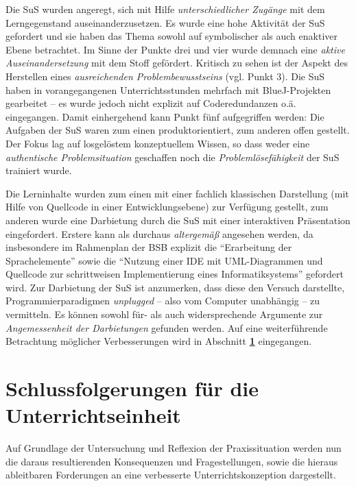 \documentclass[paper=a4, DIV=13, BCOR=8mm, oneside=on, onecolumn=on, open = any, titlepage =on, parskip =half-, headsepline = on, footsepline = off, chapterprefix = on, sectionprefix = on, appendixprefix = off, fontsize = 12pt, numbers = noenddot, abstract = off]{scrreprt}
\begin{document}
Die SuS wurden angeregt, sich mit Hilfe \emph{unterschiedlicher Zugänge} mit dem Lerngegenstand auseinanderzusetzen. Es wurde eine hohe Aktivität der SuS gefordert und sie haben das Thema sowohl auf symbolischer als auch enaktiver Ebene betrachtet. Im Sinne der Punkte drei und vier wurde demnach eine \emph{aktive Auseinandersetzung} mit dem Stoff gefördert. Kritisch zu sehen ist der Aspekt des Herstellen eines \emph{ausreichenden Problembewusstseins} (vgl. Punkt 3). Die SuS haben in vorangegangenen Unterrichtsstunden mehrfach mit BlueJ-Projekten gearbeitet -- es wurde jedoch nicht explizit auf Coderedundanzen o.ä. eingegangen. Damit einhergehend kann Punkt fünf aufgegriffen werden: Die Aufgaben der SuS waren zum einen produktorientiert, zum anderen offen gestellt. Der Fokus lag auf losgelöstem konzeptuellem Wissen, so dass weder eine \emph{authentische Problemsituation} geschaffen noch die \emph{Problemlösefähigkeit} der SuS trainiert wurde.

Die Lerninhalte wurden zum einen mit einer fachlich klassischen Darstellung (mit Hilfe von Quellcode in einer Entwicklungsebene) zur Verfügung gestellt, zum anderen wurde eine Darbietung durch die SuS mit einer interaktiven Präsentation eingefordert. Erstere kann als durchaus \emph{altergemäß} angesehen werden, da insbesondere im Rahmenplan der BSB explizit die "`Erarbeitung der Sprachelemente"' sowie die "`Nutzung einer IDE mit UML-Diagrammen und Quellcode zur schrittweisen Implementierung eines Informatiksystems"' \cite[S.17]{oberstufe:09} gefordert wird. Zur Darbietung der SuS ist anzumerken, dass diese den Versuch darstellte, Programmierparadigmen \emph{unplugged} -- also vom Computer unabhängig -- zu vermitteln. Es können sowohl für- als auch widersprechende Argumente zur \emph{Angemessenheit der Darbietungen} gefunden werden. Auf eine weiterführende Betrachtung möglicher Verbesserungen wird in Abschnitt \textbf{\ref{schlussfolgerungen}} eingegangen.

\par \singlespacing
\chapter{Schlussfolgerungen für die Unterrichtseinheit}
\label{schlussfolgerungen}
\onehalfspacing
\vspace*{-1cm}
Auf Grundlage der Untersuchung und Reflexion der Praxissituation werden nun die daraus resultierenden Konsequenzen und Fragestellungen, sowie die hieraus ableitbaren Forderungen an eine verbesserte Unterrichtskonzeption dargestellt.
\end{document}
